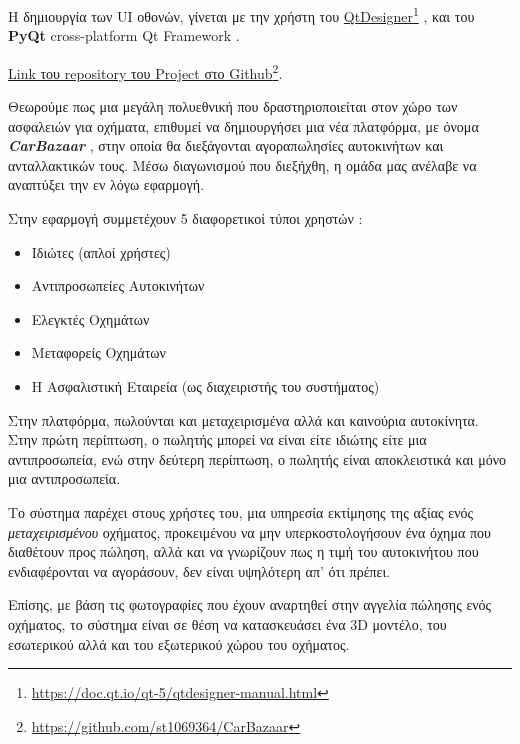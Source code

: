 \documentclass{../ol-softwaremanual}
\newcommand{\doclink}[2]{\href{#1}{#2}\footnote{\url{#1}}}
\begin{document}
	Η δημιουργία των \en UI \gr οθονών, γίνεται με την χρήστη του \en \doclink{https://doc.qt.io/qt-5/qtdesigner-manual.html}{QtDesigner} \gr, και του  \en \textbf{PyQt} cross-platform Qt Framework \gr. \break
	
	\en 	\doclink{https://github.com/st1069364/CarBazaar}{Link \gr του \en  repository \gr του \en Project \gr στο \en Github}. \gr
	
	\newpage
	
	
	\vspace{10pt}
	
	\flushleft
	
	Θεωρούμε πως μια μεγάλη πολυεθνική που δραστηριοποιείται στον χώρο των ασφαλειών για οχήματα, επιθυμεί να δημιουργήσει μια νέα πλατφόρμα, με όνομα  \en \textbf{\textit{CarBazaar}} \gr, στην οποία θα διεξάγονται αγοραπωλησίες αυτοκινήτων και ανταλλακτικών τους. Μέσω διαγωνισμού που διεξήχθη, η ομάδα μας ανέλαβε να αναπτύξει την εν λόγω εφαρμογή. \break
	
	Στην εφαρμογή συμμετέχουν 5 διαφορετικοί τύποι χρηστών :
	
	\begin{itemize}
		\item Ιδιώτες (απλοί χρήστες)
		\item Αντιπροσωπείες Αυτοκινήτων
		\item Ελεγκτές Οχημάτων
		\item Μεταφορείς Οχημάτων
		\item Η Ασφαλιστική Εταιρεία (ως διαχειριστής του συστήματος)
	\end{itemize}
	
	Στην πλατφόρμα, πωλούνται και μεταχειρισμένα αλλά και καινούρια αυτοκίνητα. Στην πρώτη περίπτωση, ο πωλητής μπορεί να είναι είτε ιδιώτης είτε μια αντιπροσωπεία, ενώ στην δεύτερη περίπτωση, ο πωλητής είναι αποκλειστικά και μόνο μια αντιπροσωπεία.  \break	
	
	Το σύστημα παρέχει στους χρήστες του, μια υπηρεσία εκτίμησης της αξίας ενός \textit{μεταχειρισμένου} οχήματος, προκειμένου να μην υπερκοστολογήσουν ένα όχημα που διαθέτουν προς πώληση, αλλά και να γνωρίζουν πως η τιμή του αυτοκινήτου που ενδιαφέρονται να αγοράσουν, δεν είναι υψηλότερη απ' ότι πρέπει. \break
	
	Επίσης, με βάση τις φωτογραφίες που έχουν αναρτηθεί στην αγγελία πώλησης ενός οχήματος, το σύστημα είναι σε θέση να κατασκευάσει ένα 3\en D \gr μοντέλο, του εσωτερικού αλλά και του εξωτερικού χώρου του οχήματος. \break
	
\end{document}
